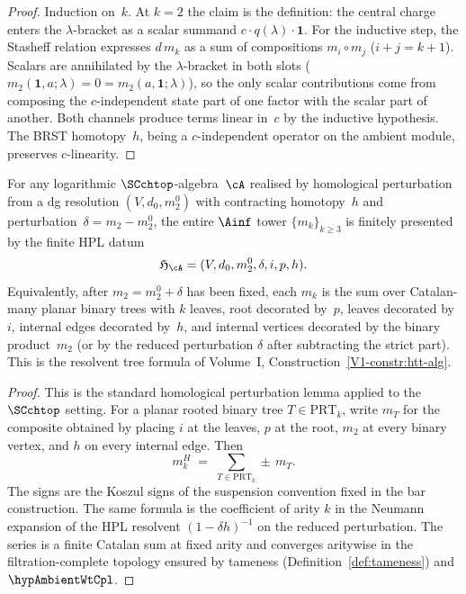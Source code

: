 \begin{proof}
Induction on~$k$. At $k = 2$ the claim is the definition:
the central charge enters the $\lambda$-bracket as a scalar
summand $c \cdot q(\lambda) \cdot \mathbf{1}$. For the inductive
step, the Stasheff relation expresses $d\,m_k$ as a sum of
compositions $m_i \circ m_j$ ($i+j = k+1$). Scalars are
annihilated by the $\lambda$-bracket in both slots
($m_2(\mathbf{1}, a; \lambda) = 0 = m_2(a, \mathbf{1}; \lambda)$),
so the only scalar contributions come from composing the
$c$-independent state part of one factor with the scalar part
of another. Both channels produce terms linear in~$c$ by the
inductive hypothesis. The BRST homotopy~$h$, being a
$c$-independent operator on the ambient module, preserves
$c$-linearity.
\end{proof}

\begin{proposition}
\label{prop:finite-presentation-general}
For any logarithmic $\SCchtop$-algebra~$\cA$ realised by
homological perturbation from a dg resolution
$(V, d_0, m_2^0)$ with contracting homotopy~$h$
and perturbation~$\delta = m_2 - m_2^0$,
the entire $\Ainf$ tower $\{m_k\}_{k \ge 3}$ is finitely
presented by the finite HPL datum
\[
\mathfrak H_{\cA}=(V,d_0,m_2^0,\delta,i,p,h).
\]
Equivalently, after $m_2=m_2^0+\delta$ has been fixed, each
$m_k$ is the sum over Catalan-many planar binary trees with
$k$ leaves, root decorated by~$p$, leaves decorated by~$i$,
internal edges decorated by~$h$, and internal vertices decorated by
the binary product~$m_2$ \textup{(}or by the reduced perturbation
$\delta$ after subtracting the strict part\textup{)}. This is the
resolvent tree formula of Volume~I,
Construction~\ref*{V1-constr:htt-alg}.
\end{proposition}

\begin{proof}
This is the standard homological perturbation lemma
applied to the $\SCchtop$ setting.
For a planar rooted binary tree $T\in\mathrm{PRT}_k$, write
$m_T$ for the composite obtained by placing $i$ at the leaves,
$p$ at the root, $m_2$ at every binary vertex, and $h$ on every
internal edge. Then
\[
m_k^H
\;=\;
\sum_{T\in\mathrm{PRT}_k}\pm\, m_T .
\]
The signs are the Koszul signs of the suspension convention fixed in
the bar construction.  The same formula is the coefficient of arity
$k$ in the Neumann expansion of the HPL resolvent
$(1-\delta h)^{-1}$ on the reduced perturbation.  The series is a
finite Catalan sum at fixed arity and converges aritywise in the
filtration-complete topology ensured by tameness
\textup{(}Definition~\ref{def:tameness}\textup{)} and
$\hypAmbientWtCpl$.
\end{proof}

